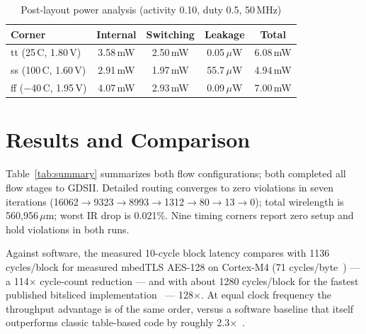 \documentclass[conference]{IEEEtran}
\begin{document}
\begin{table}[htbp]
\caption{Post-layout power analysis (activity 0.10, duty 0.5, 50\,MHz)}
\label{tab:power}
\centering
\footnotesize
\setlength{\tabcolsep}{4.0pt}
\begin{tabular}{lcccc}
\toprule
Corner & Internal & Switching & Leakage & Total \\
\midrule
tt (25\,C, 1.80\,V) & 3.58\,mW & 2.50\,mW & 0.05\,$\mu$W & 6.08\,mW \\
ss (100\,C, 1.60\,V) & 2.91\,mW & 1.97\,mW & 55.7\,$\mu$W & 4.94\,mW \\
ff ($-$40\,C, 1.95\,V) & 4.07\,mW & 2.93\,mW & 0.09\,$\mu$W & 7.00\,mW \\
\bottomrule
\end{tabular}
\end{table}

\section{Results and Comparison}
\label{sec:results}
Table~\ref{tab:summary} summarizes both flow configurations; both completed
all flow stages to GDSII. Detailed routing converges to zero violations in
seven iterations (16062$\to$9323$\to$8993$\to$1312$\to$80$\to$13$\to$0);
total wirelength is 560{,}956\,$\mu$m; worst IR drop is 0.021\%. Nine
timing corners report zero setup and hold violations in both runs.

Against software, the measured 10-cycle block latency compares with 1136
cycles/block for measured mbedTLS AES-128 on Cortex-M4 (71
cycles/byte~\cite{mbedtlsbench}) --- a 114$\times$ cycle-count reduction ---
and with about 1280 cycles/block for the fastest published bitsliced
implementation~\cite{kimseo25} --- 128$\times$. At equal clock frequency the
throughput advantage is of the same order, versus a software baseline that
itself outperforms classic table-based code by roughly
2.3$\times$~\cite{schwabe17}.
\end{document}

